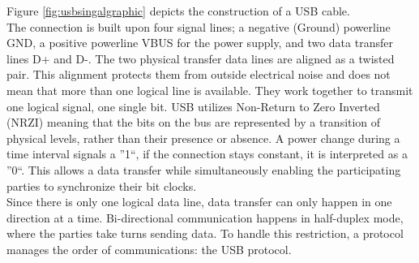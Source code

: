Figure \ref{fig:usbsingalgraphic} depicts the construction of a USB cable. \\
The connection is built upon four signal lines; a negative (Ground) powerline GND, a positive powerline VBUS for the power supply, and two data transfer lines D+ and D-. The two physical transfer data lines are aligned as a twisted pair. This alignment protects them from outside electrical noise and does not mean that more than one logical line is available. They work together to transmit one logical signal, one single bit. USB utilizes Non-Return to Zero Inverted (NRZI) meaning that the bits on the bus are represented by a transition of physical levels, rather than their presence or absence. A power change during a time interval signals a ''1``, if the connection stays constant, it is interpreted as a ''0``. This allows a data transfer while simultaneously enabling the participating parties to synchronize their bit clocks.  \\
Since there is only one logical data line, data transfer can only happen in one direction at a time. Bi-directional communication happens in half-duplex mode, where the parties take turns sending data. To handle this restriction, a protocol manages the order of communications: the USB protocol. \\

